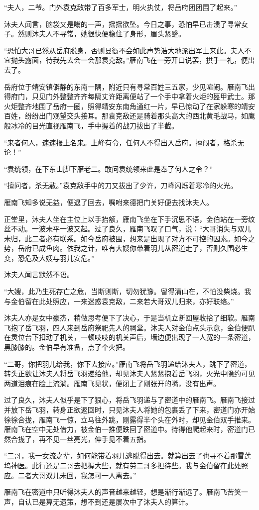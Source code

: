 “夫人，二爷。门外袁克敌带了百多军士，明火执仗，将岳府团团围了起来。”

沐夫人闻言，脑袋又是嗡的一声，摇摇欲坠。今日之事，恐怕早已击溃了寻常女子。然则沐夫人不寻常，她很快便稳住了身形，眉头紧蹙。

“恐怕大哥已然从岳府脱身，否则县衙不会如此声势浩大地派出军士来此。夫人不宜抛头露面，待我先去会一会那袁克敌。”雁南飞在一旁开口说罢，拱手一礼，便出去了。

岳府位于靖安镇僻静的东南一隅，附近只有寻常百姓三五家，少见喧闹。雁南飞出得府门，只见门外整整齐齐每隔丈许距离便站了一个手中拿着火炬的盔甲武士。那火炬整齐地围了岳府一圈，照得靖安东南角通红一片，早已惊动了在家躲寒的靖安百姓，纷纷出门观望交头接耳。那袁克敌还是骑着那头高大的西北黄毛战马，如鹰般冰冷的目光直视雁南飞，手中握着的战刀拔出了半截。

“来者何人，速速报上名来。上峰有令，任何人不得出入岳府。擅闯者，格杀无论！”

“袁统领，在下东山脚下雁老二。敢问袁统领来此是奉了何人之令？”

“擅问者，杀无赦。”袁克敌手中的刀又拔出了少许，刀峰闪烁着寒冷的火光。

雁南飞知多说无益，便退了回去，嘱咐来德把门关好便去找沐夫人。

正堂里，沐夫人坐在主位上以手抬额，雁南飞坐在下手沉思不语，金伯站在一旁纹丝不动。一波未平一波又起。过了良久，雁南飞叹了口气，说：“大哥消失与双儿未归，此二者必有联系。如今岳府被围，想来是出现了对方不可控的因素。如今之势，岳府已成鱼肉。依我之计，唯有大嫂你带着羽儿从密道走了，否则久围必生变，恐危及大嫂与羽儿安危。”

沐夫人闻言默然不语。

“大嫂，此乃生死存亡之危，当断则断，切勿犹豫。留得清山在，不怕没柴烧。我与金伯留在此处照应，一来迷惑袁克敌，二来若大哥双儿归来，亦好联络。”

沐夫人亦是女中豪杰，稍做思考便下了决心，于是当机立断回屋收拾了细软。雁南飞抱了岳飞羽，四人来到岳府祭祀先人的祠堂。沐夫人对金伯点头示意，金伯便趴在灵位台下扣动了机关，一顿吱吱的机关声后，墙边便出现了一人宽的一条密道，黑膝膝的。金伯早有准备，点了个火把。

“二哥，你把羽儿给我，你下去接应。”雁南飞将岳飞羽递给沐夫人，跳下了密道，转头正欲让沐夫人将岳飞羽递给他，却见沐夫人紧紧抱着岳飞羽，火光中隐约可见两道泪痕在脸上流淌。雁南飞见状，便闭上了刚张开的嘴，没有出声。

过了良久，沐夫人似乎是下了狠心，将岳飞羽递与了密道中的雁南飞。雁南飞接过并放下岳飞羽，转身正欲返回时，只见沐夫人将她的包裹丢了下来，密道门亦开始徐徐合拢，雁南飞一惊，立马往外跳，刚露得半个头在外时，却见金伯双手推来。雁南飞在空中无处借力，被金伯一推便跌回了密道中。待得他爬起来时，密道门已然合拢了，再不见一丝亮光，伸手见不着五指。

“二哥，我一女流之辈，如何能带着羽儿逃脱得出去。就算出去了也寻不着那雪莲坞神医。此行还是二哥去把握大些，就有劳二哥多担待些。我与金伯留在此处照应。二者大哥双儿未回，我怎可一人离去。”

雁南飞在密道中只听得沐夫人的声音越来越轻，想是渐行渐远了。雁南飞苦笑一声，自认已是算无遗策，想不到还是屡次中了沐夫人的算计。